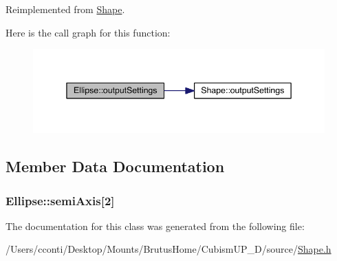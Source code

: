 Reimplemented from \hyperlink{class_shape_ad01448fd3ab6d48e7b6d72ef2fa0822a}{Shape}.



Here is the call graph for this function\+:\nopagebreak
\begin{figure}[H]
\begin{center}
\leavevmode
\includegraphics[width=345pt]{dc/d25/class_ellipse_a58769b0a44b34c8d045be4ef0bcd4a71_cgraph}
\end{center}
\end{figure}




\subsection{Member Data Documentation}
\hypertarget{class_ellipse_aa4758f568a38a31bbea0b4b424486a40}{}
\subsubsection[{semi\+Axis}]{ Ellipse\+::semi\+Axis\mbox{[}2\mbox{]}\hspace{0.3cm}{\ttfamily [protected]}}\label{class_ellipse_aa4758f568a38a31bbea0b4b424486a40}


The documentation for this class was generated from the following file\+:\begin{DoxyCompactItemize}
\item 
/\+Users/cconti/\+Desktop/\+Mounts/\+Brutus\+Home/\+Cubism\+U\+P\+\_\+D/source/\hyperlink{_shape_8h}{Shape.\+h}\end{DoxyCompactItemize}
